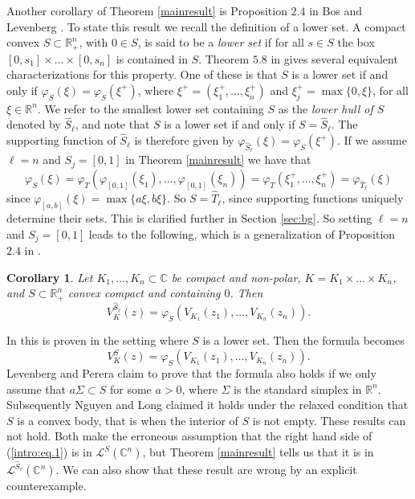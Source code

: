 \documentclass[a4paper,12pt,leqno,english]{article}
\numberwithin{equation}{section}
\newtheorem{corollary+}  [theorem+]  {Corollary}
\newenvironment{corollary}{\begin{corollary+}\sl}{\end{corollary+}\rm}
\begin{document}
Another corollary of Theorem \ref{mainresult} is Proposition $2.4$ in Bos and Levenberg \cite{BosLev:2018}.
To state this result we recall the definition of a lower set.
A compact convex $S \subset \mathbb{R}^n_+$, with $0 \in S$, is said to be a \emph{lower set} if for all $s \in S$ the box
    $[0, s_1] \times \dots \times [0, s_n]$ is contained in $S$.
Theorem $5.8$ in \cite{MagSigSigSno:2023} gives several equivalent characterizations for this property.
One of these is that $S$ is a lower set if and only if $\varphi_S(\xi) = \varphi_S(\xi^+)$,
    where $\xi^+ = (\xi_1^+, \dots, \xi_n^+)$ and $\xi_j^+ = \max\{0, \xi\}$, for all $\xi \in \mathbb{R}^n$.
We refer to the smallest lower set containing $S$ as the \emph{lower hull of $S$} denoted by $\hat{S}_\ell$,
    and note that $S$ is a lower set if and only if $S = \hat{S}_\ell$.
The supporting function of $\hat{S}_\ell$ is therefore given by $\varphi_{\hat{S}_\ell}(\xi) = \varphi_S(\xi^+)$.
If we assume $\ell = n$ and $S_j = [0, 1]$ in Theorem \ref{mainresult} we have that
\begin{equation*}
    \varphi_S(\xi)
    =
    \varphi_T(\varphi_{[0, 1]}(\xi_1), \dots, \varphi_{[0, 1]}(\xi_n))
    =
    \varphi_T(\xi_1^+, \dots, \xi_n^+)
    =
    \varphi_{\hat{T}_\ell}(\xi)
\end{equation*}
since $\varphi_{[a, b]}(\xi) = \max\{a\xi, b\xi\}$.
So $S = \hat{T}_\ell$, since supporting functions uniquely determine their sets.
This is clarified further in Section \ref{sec:bg}.
So setting $\ell = n$ and $S_j = [0, 1]$ leads to the following, which is a generalization of Proposition $2.4$ in \cite{BosLev:2018}.
\begin{corollary}
Let
    $K_1, \dots, K_n \subset \mathbb{C}$ be compact and non-polar,
    $K = K_1 \times \dots \times K_n$, and
    $S \subset \mathbb{R}_+^n$ convex compact and containing $0$.
Then
\begin{equation*}
    V^{\hat{S}_\ell}_K(z)
    =
    \varphi_S(V_{K_1}(z_1), \dots, V_{K_n}(z_n)).
\end{equation*}
\end{corollary}

In \cite{BosLev:2018} this is proven in the setting where $S$ is a lower set.
Then the formula becomes
\begin{equation}
\label{intro:eq.1}
    V^S_K(z)
    =
    \varphi_S(V_{K_1}(z_1), \dots, V_{K_n}(z_n)).
\end{equation}
Levenberg and Perera \cite{LevPer:2020} claim to prove that the formula also holds if we only assume that $a \Sigma \subset S$ for some $a > 0$, where
    $\Sigma$ is the standard simplex in $\mathbb{R}^n$.
Subsequently Nguyen and Long \cite{NguTan:2021} claimed it holds under the relaxed condition that $S$ is a convex body,
    that is when the interior of $S$ is not empty.
These results can not hold.
Both make the erroneous assumption that the right hand side of (\ref{intro:eq.1}) is in $\mathcal{L}^S(\mathbb{C}^n)$,
    but Theorem \ref{mainresult} tells us that it is in $\mathcal{L}^{\hat{S}_\ell}(\mathbb{C}^n)$.
We can also show that these result are wrong by an explicit counterexample.
\end{document}
